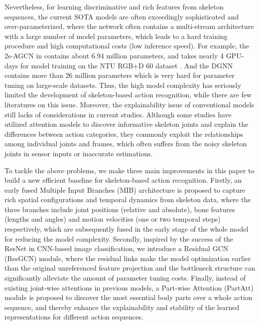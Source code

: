 \documentclass[sigconf]{acmart}
\begin{document}
Nevertheless, for learning discriminative and rich features from skeleton sequences, the current SOTA models are often exceedingly sophisticated and over-parameterized, where the network often contains a multi-stream architecture with a large number of model parameters, which leads to a hard training procedure and high computational costs (low inference speed). For example, the 2s-AGCN in \cite{shi2019two} contains about 6.94 million parameters, and takes nearly 4 GPU-days for model training on the NTU RGB+D 60 dataset \cite{shahroudy2016ntu}. And the DGNN \cite{shi2019skeleton} contains more than 26 million parameters which is very hard for parameter tuning on large-scale datasets. Thus, the high model complexity has seriously limited the development of skeleton-based action recognition, while there are few literatures on this issue. Moreover, the explainability issue of conventional models still lacks of considerations in current studies. Although some studies \cite{song2017end, si2019attention} have utilized attention models to discover informative skeleton joints and explain the differences between action categories, they commonly exploit the relationships among individual joints and frames, which often suffers from the noisy skeleton joints in sensor inputs or inaccurate estimations.

To tackle the above problems, we make three main improvements in this paper to build a new efficient baseline for skeleton-based action recognition. Firstly, an early fused Multiple Input Branches (MIB) architecture is proposed to capture rich spatial configurations and temporal dynamics from skeleton data, where the three branches include joint positions (relative and absolute), bone features (lengths and angles) and motion velocities (one or two temporal steps) respectively, which are subsequently fused in the early stage of the whole model for reducing the model complexity. Secondly, inspired by the success of the ResNet \cite{he2016deep} in CNN-based image classification, we introduce a Residual GCN (ResGCN) module, where the residual links make the model optimization earlier than the original unreferenced feature projection and the bottleneck structure can significantly alleviate the amount of parameter tuning costs. Finally, instead of existing joint-wise attentions in previous models, a Part-wise Attention (PartAtt) module is proposed to discover the most essential body parts over a whole action sequence, and thereby enhance the explainability and stability of the learned representations for different action sequences.
\end{document}
